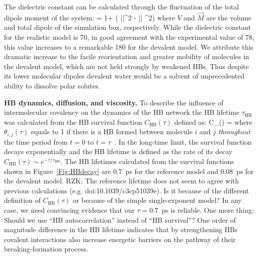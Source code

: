 \documentclass[aps,prl,reprint,amsmath,amssymb]{revtex4-1}
\begin{document}
The dielectric constant can be calculated through the fluctuation of the total dipole moment of the system\cite{neumann1983dipole,adams1981theory}:
%
\bea
\epsilon = 1+  (  \langle ||^2 \rangle  - \langle || \rangle ^2) \label{Eq:dielectric}
\eea
%
where $V$ and $\vec{M}$ are the volume and total dipole of the simulation box, respectively. 
While the dielectric constant for the realistic model is 70, in good agreement with the experimental value of 78, this value increases to a remarkable 180 for the devalent model.
We attribute this dramatic increase to the facile reorientation and greater mobility of molecules in the devalent model, which are not held strongly by weakened HBs. 
Thus despite its lower molecular dipoles devalent water would be a solvent of unprecedented ability to dissolve polar solutes.

\textbf{HB dynamics, diffusion, and viscosity.} To describe the influence of intermolecular covalency on the dynamics of the HB network the HB lifetime $\tau_{\text{HB}}$ was calculated from the HB survival function $C_{\text{HB}}(\tau)$ defined as:
%
\bea
C_{}(\tau) =  \label{Eq:HBdecay}
\eea
where $\theta_{i,j}(\tau)$ equals to 1 if there is a HB formed between molecule $i$ and $j$ \emph{throughout} the time period from $t=0$ to $t=\tau$~\cite{RZK}. 
In the long-time limit, the survival function decays exponentially and the HB lifetime is defined as the rate of its decay $C_{\text{HB}}(\tau) \sim e^{-\tau/\tau_{\text{HB}}}$. 
The HB lifetimes calculated from the survival functions shown in Figure~\ref{Fig:HBdecay} are 0.7~ps for the reference model and 0.08~ps for the devalent model. \new RZK: The reference lifetime does not seem to agree with previous calculations (e.g. doi:10.1039/c3cp51039e). Is it because of the different definition of $C_{\text{HB}}(\tau)$ or because of the simple single-exponent model? In any case, we need convincing evidence that our $\tau=0.7$~ps is reliable. One more thing: Should we use ``HB autocorrelation'' instead of ``HB survival''? \old One order of magnitude difference in the HB lifetime indicates that by strengthening HBs covalent interactions also increase energetic barriers on the pathway of their breaking-formation process.
\end{document}
